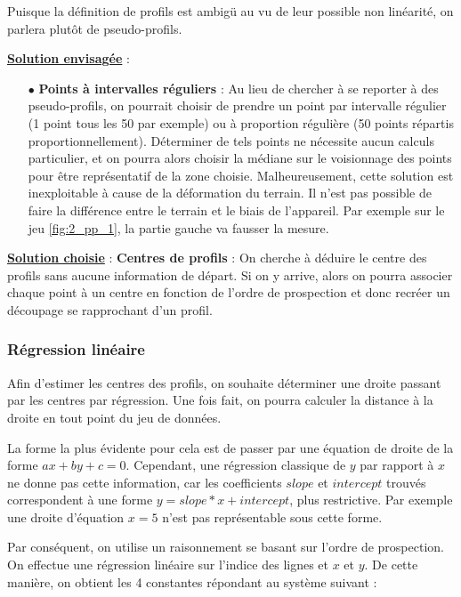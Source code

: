 \documentclass[12pt]{article}
\begin{document}
    Puisque la définition de profils est ambigü au vu de leur possible non linéarité, on parlera plutôt de pseudo-profils.

    \noindent\textbf{\underline{Solution envisagée}} :
    \begin{enumerate}
        \item[$\bullet$] \textbf{Points à intervalles réguliers} : Au lieu de chercher à se reporter à des pseudo-profils, on pourrait choisir de prendre un point par intervalle régulier (1 point tous les 50 par exemple) ou à proportion régulière (50 points répartis proportionnellement). Déterminer de tels points ne nécessite aucun calculs particulier, et on pourra alors choisir la médiane sur le voisionnage des points pour être représentatif de la zone choisie. Malheureusement, cette solution est inexploitable à cause de la déformation du terrain. Il n'est pas possible de faire la différence entre le terrain et le biais de l'appareil. Par exemple sur le jeu \ref{fig:2_pp_1}, la partie gauche va fausser la mesure.
    \end{enumerate}
    \textbf{\underline{Solution choisie}} : \textbf{Centres de profils} : On cherche à déduire le centre des profils sans aucune information de départ. Si on y arrive, alors on pourra associer chaque point à un centre en fonction de l'ordre de prospection et donc recréer un découpage se rapprochant d'un profil.

    \subsubsection{Régression linéaire}

    Afin d'estimer les centres des profils, on souhaite déterminer une droite passant par les centres par régression. Une fois fait, on pourra calculer la distance à la droite en tout point du jeu de données.

    La forme la plus évidente pour cela est de passer par une équation de droite de la forme $ax + by + c = 0$. Cependant, une régression classique de $y$ par rapport à $x$ ne donne pas cette information, car les coefficients $slope$ et $intercept$ trouvés correspondent à une forme $y = slope*x + intercept$, plus restrictive. Par exemple une droite d'équation $x = 5$ n'est pas représentable sous cette forme.

    Par conséquent, on utilise un raisonnement se basant sur l'ordre de prospection. On effectue une régression linéaire sur l'indice des lignes et $x$ et $y$. De cette manière, on obtient les 4 constantes répondant au système suivant :
\end{document}
